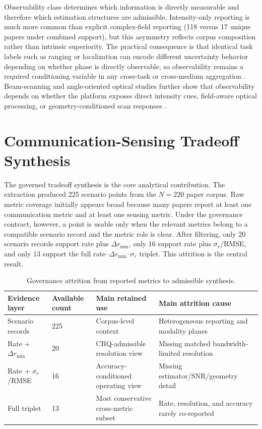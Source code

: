 \documentclass[letterpaper,journal]{IEEEtran}
\begin{document}
Observability class determines which information is directly measurable and therefore which estimation structures are admissible. Intensity-only reporting is much more common than explicit complex-field reporting (118 versus 17 unique papers under combined support), but this asymmetry reflects corpus composition rather than intrinsic superiority. The practical consequence is that identical task labels such as ranging or localization can encode different uncertainty behavior depending on whether phase is directly observable, so observability remains a required conditioning variable in any cross-task or cross-medium aggregation . Beam-scanning and angle-oriented optical studies further show that observability depends on whether the platform exposes direct intensity cues, field-aware optical processing, or geometry-conditioned scan responses .

\section{Communication-Sensing Tradeoff Synthesis}
\label{sec:tradeoff}

The governed tradeoff synthesis is the core analytical contribution. The extraction produced 225 scenario points from the \(N=220\) paper corpus. Raw metric coverage initially appears broad because many papers report at least one communication metric and at least one sensing metric. Under the governance contract, however, a point is usable only when the relevant metrics belong to a compatible scenario record and the metric role is clear. After filtering, only 20 scenario records support rate plus \(\Delta r_{\min}\), only 16 support rate plus \(\sigma_r\)/RMSE, and only 13 support the full rate--\(\Delta r_{\min}\)--\(\sigma_r\) triplet. This attrition is the central result.

\begin{table}[!t]
    \caption{Governance attrition from reported metrics to admissible synthesis.}
    \label{tab:governance_attrition}
    \centering
    \scriptsize
    \setlength{\tabcolsep}{3pt}
    \renewcommand{\arraystretch}{1.08}
    \begin{tabularx}{\textwidth}{@{}L{2.8cm}L{2.0cm}L{2.2cm}Y@{}}
        \toprule
        Evidence layer & Available count & Main retained use & Main attrition cause \\
        \midrule
        Scenario records & 225 & Corpus-level context & Heterogeneous reporting and modality planes \\
        Rate + $\Delta r_{\min}$ & 20 & CRQ-admissible resolution view & Missing matched bandwidth-limited resolution \\
        Rate + $\sigma_r$/RMSE & 16 & Accuracy-conditioned operating view & Missing estimator/SNR/geometry detail \\
        Full triplet & 13 & Most conservative cross-metric subset & Rate, resolution, and accuracy rarely co-reported \\
        \bottomrule
    \end{tabularx}
\end{table}
\end{document}
